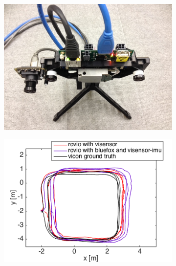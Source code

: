 \chapter{}\label{sec:appendix_mydata}

\begin{figure}[h]
  \begin{subfigure}[b]{0.42\textwidth}
    \includegraphics[width=\textwidth]{images/vi_bluefox.JPG}
    \caption{}
  \end{subfigure}
  \hfill
  \begin{subfigure}[b]{0.42\textwidth}
    \includegraphics[width=\textwidth]{images/slow_2D.png}
    \caption{}
  \end{subfigure}
  \hfill
  \begin{subfigure}[b]{0.42\textwidth}

\end{subfigure}
\end{figure}

